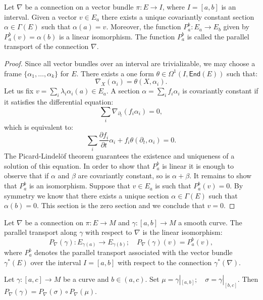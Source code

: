 \begin{proposition}
	Let $\nabla$ be a connection on a vector bundle $\pi:E\rightarrow I$, where
	$I=[a,b]$ is an interval. Given a vector $v\in E_{a}$ there exists a unique
	covariantly constant section $\alpha\in\Gamma(E)$ such that $\alpha(a)=v.$
	Moreover, the function $P_{a}^{b}:E_{a}\rightarrow E_{b}$ given by $P_{a}%
	^{b}(v)=\alpha(b)$ is a linear isomorphism. The function $P_{a}^{b}$ is called
	the parallel transport of the connection $\nabla$.
\end{proposition}

\begin{proof}
	Since all vector bundles over an interval are trivializable, we may choose a frame $\{\alpha_1,\dots, \alpha_k\}$ for $E$.
	There exists a one form $\theta \in \Omega^1(I, \mathsf{End}(E))$ such that:
	\[ \nabla_X (\alpha_i)= \theta(X, \alpha_i).\]
	Let us fix $v = \sum_i \lambda_i \alpha_i(a) \in E_a$. A section $ \alpha= \sum_i f_i \alpha_i$  is covariantly constant if it satisfies the differential equation:
	\[ \sum_i \nabla_{\partial_t} (f_i \alpha_i)=0,\]
	which is equivalent to:
	\[ \sum_i \frac{\partial f_i}{\partial t} \alpha_i+ f_i\theta( \partial_t, \alpha_i)=0.\]
	The Picard-Lindel\"of theorem guarantees the existence and uniqueness of a solution of this equation. In order to show that $P_a^b$ is linear it is enough to observe that if $ \alpha$ and $\beta$ are covariantly constant, so is $\alpha + \beta $. It remains to show that  $P_a^b$ is an isomorphism. Suppose that  $v\in E_a$  is such that $P_a^b(v)=0$.
	By symmetry we know that there exists a unique section  $\alpha \in \Gamma(E)$ such that $\alpha(b)=0$. This section is the zero section and we conclude that $v=0$.
\end{proof}


\begin{definition}
	Let $\nabla$ be a connection on $\pi:E\rightarrow M$ and $\gamma
	:[a,b]\rightarrow M$ a smooth curve. The parallel transport along $\gamma$
	with respect to $\nabla$ is the linear isomorphism:
	\[
	P_{\nabla}(\gamma):E_{\gamma(a)}\rightarrow E_{\gamma(b)};\quad P_{\nabla
	}(\gamma)(v)=P_{a}^{b}(v),
	\]
	where $P_{a}^{b}$ denotes the parallel transport associated with the vector
	bundle $\gamma^{\ast}(E)$ over the interval $I=[a,b]$ with respect to the
	connection $\gamma^{\ast}(\nabla)$.
\end{definition}

\begin{lemma}
	Let $\gamma:[a,c]\rightarrow M$ be a curve and $b\in(a,c)$. Set $\mu
	=\gamma|_{[a,b]};\quad\sigma=\gamma|_{[b,c]}.$ Then $P_{\nabla}(\gamma
	)=P_{\nabla}(\sigma)\circ P_{\nabla}(\mu).$
\end{lemma}

